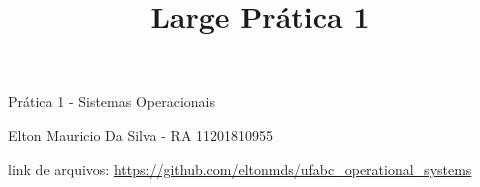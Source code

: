 




\frenchspacing 

\textual

	

	\title{Large Prática 1}	
		Prática 1 - Sistemas Operacionais	
		
		Elton Mauricio Da Silva - RA 11201810955

		link de arquivos: \url{https://github.com/eltonmds/ufabc_operational_systems}
	
	

	

	



\printindex


